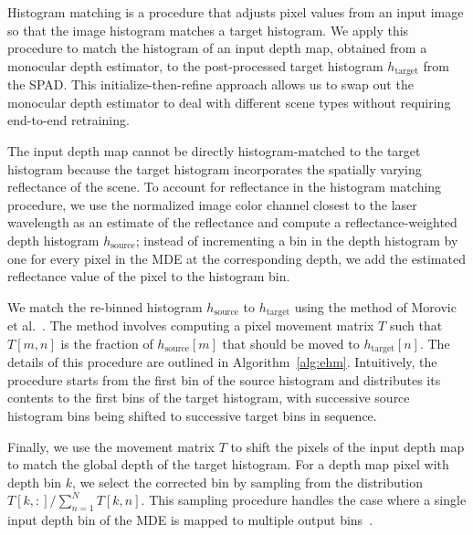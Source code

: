 Histogram matching is a procedure that adjusts pixel values from an input image
so that the image histogram matches a target histogram. We apply this procedure
to match the histogram of an input depth map, obtained from a monocular depth estimator, to the
post-processed target histogram $h_\text{target}$ from the SPAD. This
initialize-then-refine approach allows us to swap out the monocular depth
estimator to deal with different scene types without requiring end-to-end retraining.

The input depth map cannot be directly histogram-matched to the target histogram
because the target histogram incorporates the spatially varying reflectance of
the scene. To account for reflectance in the histogram matching procedure,
we use the normalized image color channel closest to the laser wavelength as an
estimate of the reflectance and compute a reflectance-weighted depth histogram
$h_\text{source}$;
instead of incrementing a bin in the depth histogram by one for every pixel in the MDE
at the corresponding depth, we add the estimated reflectance value of the pixel
to the histogram bin. 

We match the re-binned histogram $h_\text{source}$ to $h_\text{target}$ using the method of
Morovic et al.~\cite{Morovic2002}. The method involves computing a pixel movement
matrix $T$ such that $T[m, n]$ is the fraction of $h_\text{source}[m]$ that should be
moved to $h_\text{target}[n]$. The details of this procedure are outlined in
Algorithm~\ref{alg:ehm}. Intuitively, the procedure starts from the first bin of the
source histogram and distributes its contents to the first bins of the target
histogram, with successive source histogram bins being shifted to successive
target bins in sequence.

Finally, we use the movement matrix $T$ to shift the pixels of the input depth map
to match the global depth of the target histogram. For a depth map pixel with
depth bin $k$, we select the corrected bin by sampling from the distribution $T[k,
:]/\sum_{n=1}^NT[k,n]$. This sampling procedure handles the
case where a single input depth bin of the MDE is mapped to
multiple output bins~\cite{Morovic2002}.
%

%





